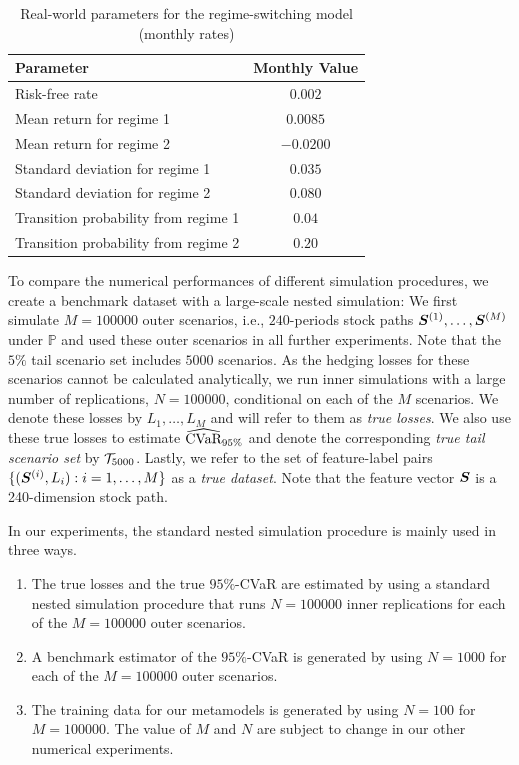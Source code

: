 \begin{table}[ht]
    \centering
    \begin{tabular}{lc}
        \toprule
        \textbf{Parameter}  & \textbf{Monthly Value} \\
        \midrule
        Risk-free rate & $0.002$ \\
        Mean return for regime 1  & $0.0085$ \\
        Mean return for regime 2   & $-0.0200$ \\
        Standard deviation for regime 1  & $0.035$ \\
        Standard deviation for regime 2  & $0.080$ \\
        Transition probability from regime 1  & $0.04$ \\
        Transition probability from regime 2  & $0.20$ \\
        \bottomrule
    \end{tabular}
    \caption{Real-world parameters for the regime-switching model (monthly rates)}
    \label{tab:regime_params}
\end{table}

To compare the numerical performances of different simulation procedures, we create a benchmark dataset with a large-scale nested simulation: We first simulate $M=\num{100000}$ outer scenarios, i.e., $240$-periods stock paths $\bm{S}^{(1)},\ldots,\bm{S}^{(M)}$ under $\mathbb{P}$ and used these outer scenarios in all further experiments.
Note that the $5\%$ tail scenario set includes $\num{5000}$ scenarios.
As the hedging losses for these scenarios cannot be calculated analytically, we run inner simulations with a large number of replications, $N=\num{100000}$, conditional on each of the $M$ scenarios.
We denote these losses by $L_1,\ldots,L_M$ and will refer to them as \textit{true losses}.
We also use these true losses to estimate $\widehat{\mbox{CVaR}}_{95\%}$ and denote the corresponding \textit{true tail scenario set} by $\mathcal{T}_{5000}$.
Lastly, we refer to the set of feature-label pairs $\{(\bm{S}^{(i)}, L_i): i=1,\ldots,M\}$ as a \textit{true dataset}.
Note that the feature vector $\bm{S}$ is a 240-dimension stock path.

In our experiments, the standard nested simulation procedure is mainly used in three ways.
\begin{enumerate}
    \item   The true losses and the true $95\%$-CVaR are estimated by using a standard nested simulation procedure that runs $N=\num{100000}$ inner replications for each of the $M=\num{100000}$ outer scenarios.
    \item   A benchmark estimator of the $95\%$-CVaR is generated by using $N=\num{1000}$ for each of the $M=\num{100000}$ outer scenarios.
    \item   The training data for our metamodels is generated by using $N=\num{100}$ for $M=\num{100000}$.
    The value of $M$ and $N$ are subject to change in our other numerical experiments.
\end{enumerate}

